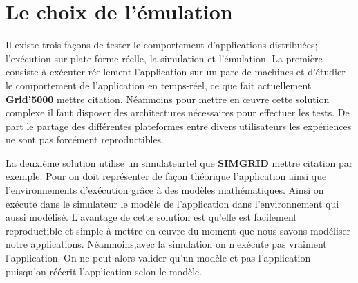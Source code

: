 \section{Le choix de l'émulation}

Il existe trois façons de tester le comportement d'applications distribuées; l'exécution sur plate-forme réelle, la simulation et l'émulation. La première consiste à exécuter réellement l'application sur un parc de machines et d'étudier le comportement de l'application en temps-réel, ce que fait actuellement \textbf{Grid'5000} {\color{red}mettre citation}. Néanmoins pour mettre en \oe uvre cette solution complexe il faut disposer des architectures nécessaires pour effectuer les tests. De part le partage des différentes plateformes entre divers utilisateurs les expériences ne sont pas forcément reproductibles. 

La deuxième solution utilise un simulateurtel que \textbf{SIMGRID} {\color{red}mettre citation} par exemple. Pour on doit représenter de façon théorique l'application ainsi que l'environnements d'exécution grâce à des modèles mathématiques. Ainsi on exécute dans le simulateur le modèle de l'application dans l'environnement qui aussi modélisé. L'avantage de cette solution est qu'elle est facilement reproductible et simple à mettre en \oe uvre du moment que nous savons modéliser notre applications. Néanmoins,avec la simulation on n'exécute pas vraiment l'application. On ne peut alors valider qu'un modèle et pas l'application puisqu'on réécrit l'application selon le modèle. 

